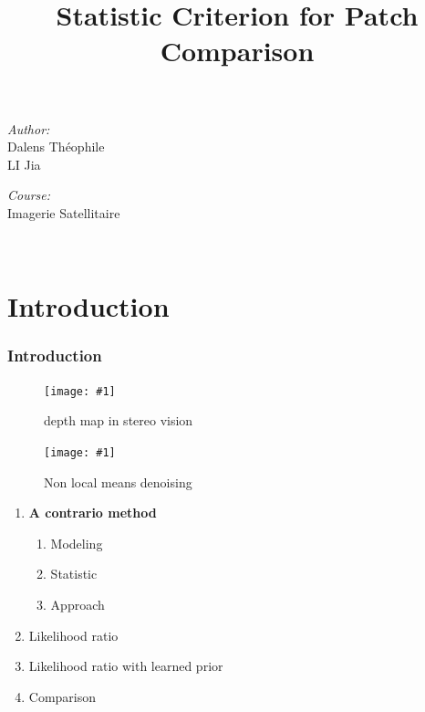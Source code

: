\documentclass[compress]{beamer} %
\newcommand{\insertF}[3]{
  \begin{figure}[h!]
    \centering
    \begin{minipage}{#3\linewidth}
    \texttt{[image: \#1]}
    \end{minipage}  
      \caption{#2}
  \end{figure}  
}
\begin{document}
 \title{Statistic Criterion for Patch Comparison}  

 \begin{frame}
\titlepage
    \centering
    \begin{minipage}{0.4\textwidth}
    \begin{flushleft} \large
    \emph{Author:}\\
    Dalens Théophile\\
    LI Jia\\
    
    \end{flushleft}
    \end{minipage}
    \begin{minipage}{0.4\textwidth}
    \begin{flushright} \large
    \emph{Course:}\\
    Imagerie Satellitaire
    \end{flushright}
    \end{minipage}\\[3cm]
 \end{frame}
 \section{Introduction}
 \begin{frame}
  \frametitle{Introduction}
  \insertF{ste}{depth map in stereo vision}{0.5}
  \insertF{debruitage}{Non local means denoising}{0.6}
 \end{frame}

 \begin{frame}
 \scriptsize
 {
 \begin{enumerate}


  \item \textbf{A contrario method}
  \begin{enumerate}
   \item Modeling
   \item Statistic
   \item Approach
   
  \end{enumerate}

  \item Likelihood ratio
  \item Likelihood ratio with learned prior
  \item Comparison
  
 \end{enumerate}

  
 }
 \end{frame} 
 
\end{document}
